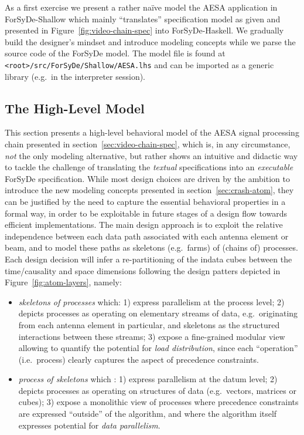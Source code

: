 \documentclass[
  a4paper,
]{article}
\begin{document}
As a first exercise we present a rather naïve model the AESA application
in ForSyDe-Shallow which mainly ``translates'' specification model as
given and presented in Figure~\ref{fig:video-chain-spec} into
ForSyDe-Haskell. We gradually build the designer's mindset and introduce
modeling concepts while we parse the source code of the ForSyDe model.
The model file is found at
\texttt{\textless{}root\textgreater{}/src/ForSyDe/Shallow/AESA.lhs} and
can be imported as a generic library (e.g.~in the interpreter session).

\hypertarget{sec:atom-network}{%
\subsection{The High-Level Model}\label{sec:atom-network}}

This section presents a high-level behavioral model of the AESA signal
processing chain presented in section~\ref{sec:video-chain-spec}, which
is, in any circumstance, \emph{not} the only modeling alternative, but
rather shows an intuitive and didactic way to tackle the challenge of
translating the \emph{textual} specifications into an \emph{executable}
ForSyDe specification. While most design choices are driven by the
ambition to introduce the new modeling concepts presented in
section~\ref{sec:crash-atom}, they can be justified by the need to
capture the essential behavioral properties in a formal way, in order to
be exploitable in future stages of a design flow towards efficient
implementations. The main design approach is to exploit the relative
independence between each data path associated with each antenna element
or beam, and to model these paths as skeletons (e.g.~farms) of (chains
of) processes. Each design decision will infer a re-partitioning of the
indata cubes between the time/causality and space dimensions following
the design patters depicted in Figure~\ref{fig:atom-layers}, namely:

\begin{itemize}
\item
  \emph{skeletons of processes} which: 1) express parallelism at the
  process level; 2) depicts processes as operating on elementary streams
  of data, e.g.~originating from each antenna element in particular, and
  skeletons as the structured interactions between these streams; 3)
  expose a fine-grained modular view allowing to quantify the potential
  for \emph{load distribution}, since each ``operation'' (i.e.~process)
  clearly captures the aspect of precedence constraints.
\item
  \emph{process of skeletons} which : 1) express parallelism at the
  datum level; 2) depicts processes as operating on structures of data
  (e.g.~vectors, matrices or cubes); 3) expose a monolithic view of
  processes where precedence constraints are expressed ``outside'' of
  the algorithm, and where the algorithm itself expresses potential for
  \emph{data parallelism}.
\end{itemize}
\end{document}
